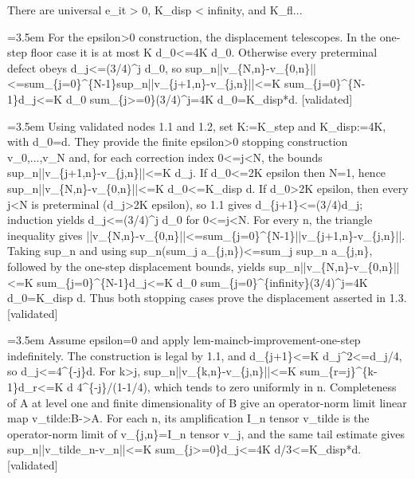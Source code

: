 \documentclass{article}
\newcommand{\step}[1]{\par\noindent\hangindent=3.5em\hangafter=1%
  \makebox[3.5em][l]{\textbf{#1.}}}
\newcommand{\steptag}[1]{\hfill{\small\textsf{[#1]}}}
\begin{document}
\begin{proofbox}{There are universal e\_it > 0, K\_disp < infinity, and K\_fl...}
\step{1.3} For the epsilon>0 construction, the displacement telescopes. In the one-step floor case it is at most K d\_0<=4K d\_0. Otherwise every preterminal defect obeys d\_j<=(3/4)\textasciicircum{}j d\_0, so sup\_n||v\_\{N,n\}-v\_\{0,n\}||<=sum\_\{j=0\}\textasciicircum{}\{N-1\}sup\_n||v\_\{j+1,n\}-v\_\{j,n\}||<=K sum\_\{j=0\}\textasciicircum{}\{N-1\}d\_j<=K d\_0 sum\_\{j>=0\}(3/4)\textasciicircum{}j=4K d\_0=K\_disp*d. \steptag{validated} \\[6pt]
\step{1.3.1} Using validated nodes 1.1 and 1.2, set K:=K\_step and K\_disp:=4K, with d\_0=d. They provide the finite epsilon>0 stopping construction v\_0,...,v\_N and, for each correction index 0<=j<N, the bounds sup\_n||v\_\{j+1,n\}-v\_\{j,n\}||<=K d\_j. If d\_0<=2K epsilon then N=1, hence sup\_n||v\_\{N,n\}-v\_\{0,n\}||<=K d\_0<=K\_disp d. If d\_0>2K epsilon, then every j<N is preterminal (d\_j>2K epsilon), so 1.1 gives d\_\{j+1\}<=(3/4)d\_j; induction yields d\_j<=(3/4)\textasciicircum{}j d\_0 for 0<=j<N. For every n, the triangle inequality gives ||v\_\{N,n\}-v\_\{0,n\}||<=sum\_\{j=0\}\textasciicircum{}\{N-1\}||v\_\{j+1,n\}-v\_\{j,n\}||. Taking sup\_n and using sup\_n(sum\_j a\_\{j,n\})<=sum\_j sup\_n a\_\{j,n\}, followed by the one-step displacement bounds, yields sup\_n||v\_\{N,n\}-v\_\{0,n\}||<=K sum\_\{j=0\}\textasciicircum{}\{N-1\}d\_j<=K d\_0 sum\_\{j=0\}\textasciicircum{}\{infinity\}(3/4)\textasciicircum{}j=4K d\_0=K\_disp d. Thus both stopping cases prove the displacement asserted in 1.3. \steptag{validated} \\[4pt]
\step{1.4} Assume epsilon=0 and apply lem-maincb-improvement-one-step indefinitely. The construction is legal by 1.1, and d\_\{j+1\}<=K d\_j\textasciicircum{}2<=d\_j/4, so d\_j<=4\textasciicircum{}\{-j\}d. For k>j, sup\_n||v\_\{k,n\}-v\_\{j,n\}||<=K sum\_\{r=j\}\textasciicircum{}\{k-1\}d\_r<=K d 4\textasciicircum{}\{-j\}/(1-1/4), which tends to zero uniformly in n. Completeness of A at level one and finite dimensionality of B give an operator-norm limit linear map v\_tilde:B->A. For each n, its amplification I\_n tensor v\_tilde is the operator-norm limit of v\_\{j,n\}=I\_n tensor v\_j, and the same tail estimate gives sup\_n||v\_tilde\_n-v\_n||<=K sum\_\{j>=0\}d\_j<=4K d/3<=K\_disp*d. \steptag{validated} \\[4pt]

\end{proofbox}
\end{document}
